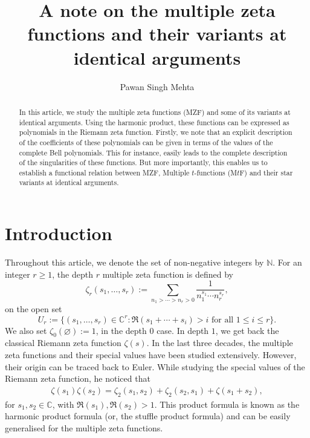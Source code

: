 \documentclass[12pt]{amsart}
\newcommand{\N}{{\mathbb N}}
\newcommand{\C}{{\mathbb C}}
\begin{document}

\title[On the multiple zeta functions and their variants at identical arguments]
{A note on the multiple zeta functions and their variants at identical arguments}

\author{Pawan Singh Mehta }

\address{Pawan Singh Mehta\\ \newline
Department of Mathematics, Indian Institute of Technology Delhi, 
Hauz Khas, New Delhi 110016, India.}



\begin{abstract}
In this article, we study the multiple zeta functions (MZF) and some of its variants at identical arguments. Using the harmonic product, these functions can be expressed as polynomials in the Riemann zeta function. Firstly, we note that an explicit description of the coefficients of these polynomials can be given in terms of the values of the complete Bell polynomials. This for instance, easily leads to the complete description of the singularities of these functions. But more importantly, this enables us to establish a functional relation between MZF, Multiple $t$-functions (M$t$F) and their star variants at identical arguments.
\end{abstract}

\maketitle
\section{Introduction}
Throughout this article, we denote the set of non-negative integers by $\N$.
For an integer $r \ge 1$, the depth $r$ multiple zeta function is defined by
$$
\zeta_r(s_1,\ldots,s_r):=\sum_{n_1>\cdots>n_r>0}\frac{1}{n_1^{s_1}\cdots n_r^{s_r}},
$$
on the open set
$$
U_r:=\{(s_1,\ldots,s_r)\in \C^r : \Re(s_1+\cdots+s_i)>i \text{ for all } 1\leq i\leq r\}.
$$
We also set $\zeta_0(\varnothing):=1$, in the depth $0$ case. In depth $1$, we get back the classical Riemann zeta function $\zeta(s)$. In the last three decades, the multiple zeta functions and their special values have been studied extensively. However, their origin can be traced back to Euler. While studying the special values of the Riemann zeta function, he noticed that
\begin{align}\label{eq-Euler}
\zeta(s_1)\zeta(s_2)=\zeta_2(s_1,s_2)+\zeta_2(s_2,s_1)+\zeta(s_1+s_2),
\end{align}
for $s_1,s_2\in \C$, with $\Re(s_1),\Re(s_2)>1$.
This product formula is known as the harmonic product formula (or, the stuffle product formula) and can be easily generalised for the multiple zeta functions.
\end{document}
